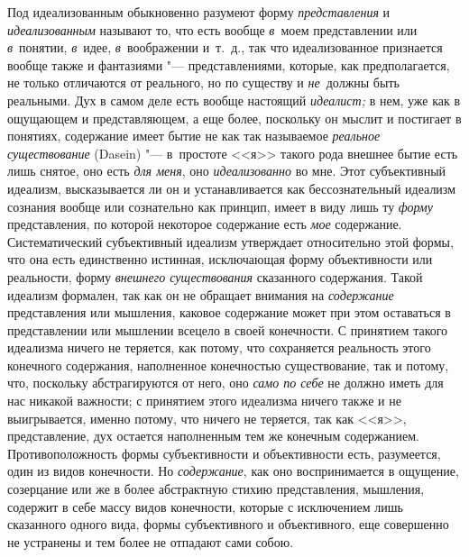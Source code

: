 Под идеализованным обыкновенно разумеют форму {\em представления} и
{\em идеализованным} называют то, что есть вообще
{\em в}~моем представлении или {\em в}~понятии, {\em в}~идее,
{\em в}~воображении и~т.~д., так что идеализованное
признается вообще также и фантазиями "--- представлениями, которые, как
предполагается, не только отличаются от реального, но по существу и
{\em не}~должны быть реальными. Дух в самом деле есть
вообще настоящий {\em идеалист;} в нем, уже как в
ощущающем и представляющем, а еще более, поскольку он мыслит и постигает в
понятиях, содержание имеет бытие не как так называемое
{\em реальное существование} (Dasein) "--- в~простоте <<я>>
такого рода внешнее бытие есть лишь снятое, оно есть {\em для меня}, оно
{\em идеализованно} во мне. Этот субъективный идеализм,
высказывается ли он и устанавливается как бессознательный идеализм сознания
вообще или сознательно как принцип, имеет в виду лишь ту
{\em форму} представления, по которой некоторое
содержание есть {\em мое} содержание. Систематический
субъективный идеализм утверждает относительно этой формы, что она есть
единственно истинная, исключающая форму объективности или реальности, форму
{\em внешнего существования} сказанного содержания.
Такой идеализм формален, так как он не обращает внимания на
{\em содержание} представления или мышления, каковое
содержание может при этом оставаться в представлении или мышлении всецело в
своей конечности. С принятием такого идеализма ничего не теряется, как
потому, что сохраняется реальность этого конечного содержания, наполненное
конечностью существование, так и потому, что, поскольку абстрагируются от
него, оно {\em само по себе} не должно иметь для нас
никакой важности; с принятием этого идеализма ничего также и не
выигрывается, именно потому, что ничего не теряется, так как <<я>>,
представление, дух остается наполненным тем же конечным содержанием.
Противоположность формы субъективности и объективности есть, разумеется,
один из видов конечности. Но {\em содержание}, как оно
воспринимается в ощущение, созерцание или же в более абстрактную стихию
представления, мышления, содержит в себе массу видов конечности, которые с
исключением лишь сказанного одного вида, формы субъективного и
объективного, еще совершенно не устранены и тем более не отпадают сами собою.

\bigskip
